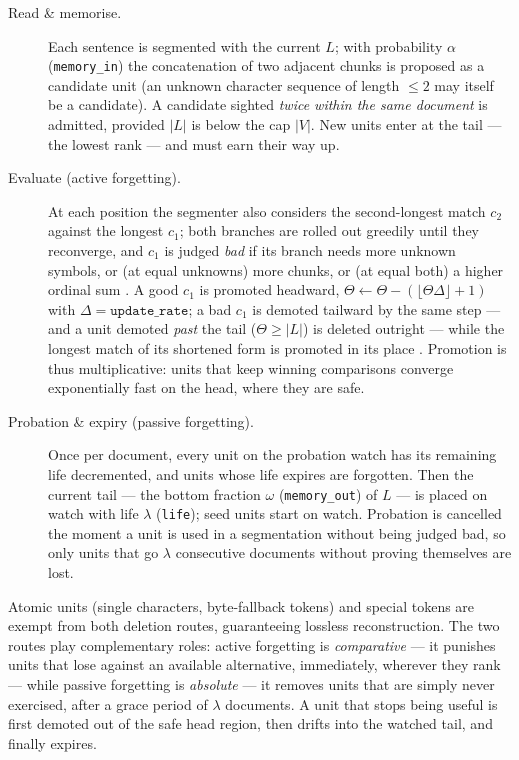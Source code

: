 \begin{description}
  \item[Read \& memorise.] Each sentence is segmented with the current $L$;
    with probability $\alpha$ (\texttt{memory\_in}) the concatenation of two
    adjacent chunks is proposed as a candidate unit (an unknown character
    sequence of length ${\le}2$ may itself be a candidate). A candidate
    sighted \emph{twice within the same document} is admitted, provided
    $|L|$ is below the cap $|V|$. New units enter at the tail — the lowest
    rank — and must earn their way up.
  \item[Evaluate (active forgetting).] At each position the segmenter also
    considers the second-longest match $c_2$ against the longest $c_1$; both
    branches are rolled out greedily until they reconverge, and $c_1$ is
    judged \emph{bad} if its branch needs more unknown symbols, or (at equal
    unknowns) more chunks, or (at equal both) a higher ordinal sum
    \citep[\S 2.3.1]{yang2020less}. A good $c_1$ is promoted headward,
    $\Theta\leftarrow\Theta-(\lfloor\Theta\Delta\rfloor+1)$ with
    $\Delta=\texttt{update\_rate}$; a bad $c_1$ is demoted tailward by the
    same step — and a unit demoted \emph{past} the tail ($\Theta\ge|L|$) is
    deleted outright — while the longest match of its shortened form is
    promoted in its place \citep[\S 2.3.2]{yang2020less}. Promotion is thus
    multiplicative: units that keep winning comparisons converge
    exponentially fast on the head, where they are safe.
  \item[Probation \& expiry (passive forgetting).] Once per document, every
    unit on the probation watch has its remaining life decremented, and units
    whose life expires are forgotten. Then the current tail — the bottom
    fraction $\omega$ (\texttt{memory\_out}) of $L$ — is placed on watch with
    life $\lambda$ (\texttt{life}); seed units start on watch. Probation is
    cancelled the moment a unit is used in a segmentation without being judged
    bad, so
    only units that go $\lambda$ consecutive documents without proving
    themselves are lost.
\end{description}

Atomic units (single characters, byte-fallback tokens) and special tokens are
exempt from both deletion routes, guaranteeing lossless reconstruction.
The two routes play complementary roles: active forgetting is
\emph{comparative} — it punishes units that lose against an available
alternative, immediately, wherever they rank — while passive forgetting is
\emph{absolute} — it removes units that are simply never exercised, after a
grace period of $\lambda$ documents. A unit that stops being useful is first
demoted out of the safe head region, then drifts into the watched tail, and
finally expires.

